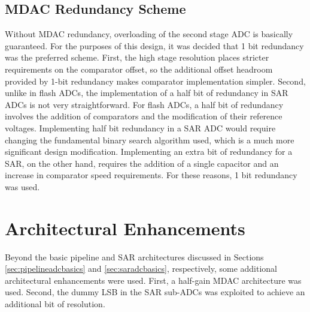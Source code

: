 \subsection{MDAC Redundancy Scheme}
 Without MDAC redundancy, overloading of the second stage ADC is basically guaranteed. For the purposes of this design, it was decided that 1 bit redundancy was the preferred scheme. First, the high stage resolution places stricter requirements on the comparator offset, so the additional offset headroom provided by 1-bit redundancy makes comparator implementation simpler. Second, unlike in flash ADCs, the implementation of a half bit of redundancy in SAR ADCs is not very straightforward. For flash ADCs, a half bit of redundancy involves the addition of comparators and the modification of their reference voltages. Implementing half bit redundancy in a SAR ADC would require changing the fundamental binary search algorithm used, which is a much more significant design modification. Implementing an extra bit of redundancy for a SAR, on the other hand, requires the addition of a single capacitor and an increase in comparator speed requirements. For these reasons, 1 bit redundancy was used. 
 \section{Architectural Enhancements}
 Beyond the basic pipeline and SAR architectures discussed in Sections \ref{sec:pipelineadcbasics} and \ref{sec:saradcbasics}, respectively, some additional architectural enhancements were used. First, a half-gain MDAC architecture was used. Second, the dummy LSB in the SAR sub-ADCs was exploited to achieve an additional bit of resolution.

